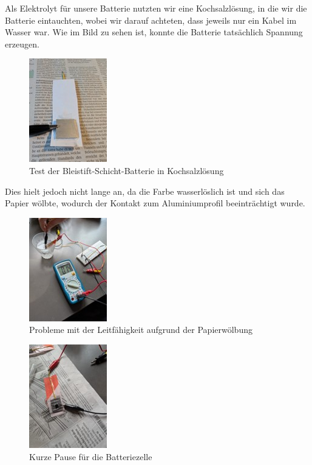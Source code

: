 \documentclass[ngerman, a4paper,12pt]{article}
\begin{document}
\vspace{12px}

\noindent Als Elektrolyt für unsere Batterie nutzten wir eine Kochsalzlösung, in die wir die Batterie eintauchten, wobei wir darauf achteten, dass jeweils nur ein Kabel im Wasser war. Wie im Bild zu sehen ist, konnte die Batterie tatsächlich Spannung erzeugen.
\begin{figure}[htbp]
	\centering
	\includegraphics[height=0.3\textheight]{Bild5.jpg}
	\caption{Test der Bleistift-Schicht-Batterie in Kochsalzlösung}\label{fig:bild5}
\end{figure}
\newpage

\noindent Dies hielt jedoch nicht lange an, da die Farbe wasserlöslich ist und sich das Papier wölbte, wodurch der Kontakt zum Aluminiumprofil beeinträchtigt wurde.
\begin{figure}[htbp]
	\centering
	\includegraphics[height=0.3\textheight]{Bild6.jpg}
	\caption{Probleme mit der Leitfähigkeit aufgrund der Papierwölbung}\label{fig:bild6}
\end{figure}

\vspace{12px}

\begin{figure}[htbp]
	\centering
	\includegraphics[height=0.3\textheight]{Bild7.jpg}
	\caption{Kurze Pause für die Batteriezelle}\label{fig:bild7}
\end{figure}
\end{document}

